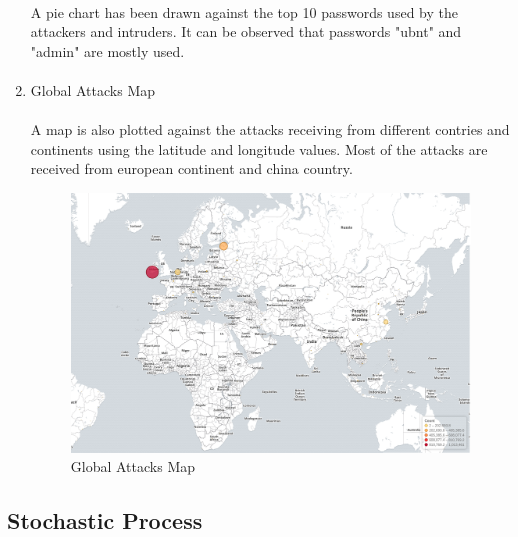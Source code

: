 \documentclass{report}
\begin{document}
\begin{enumerate}
\paragraph{}
A pie chart has been drawn against the top 10 passwords used by the attackers and intruders. It can be observed that passwords "ubnt" and "admin" are mostly used.

\paragraph{}

\item Global Attacks Map
\paragraph{}
A map is also plotted against the attacks receiving from different contries and continents using the latitude and longitude values. Most of the attacks are received from european continent and china country.

\begin{figure}[H]
\centering
\caption{Global Attacks Map}
\includegraphics[scale=0.30]{Global_Attacks_Map}
\end{figure}

\end{enumerate}

\subsection{Stochastic Process}
\end{document}
